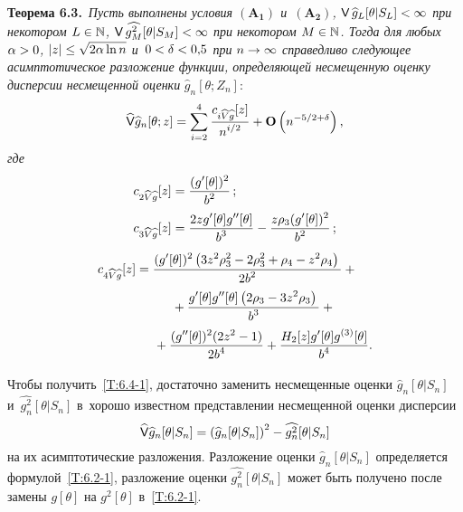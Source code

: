 \begin{multicols}{2}
\noindent
\textbf{Теорема 6.3.}\
\textit{Пусть выполнены условия $\mathbf{(A_1)}$ и~$\mathbf{(A_2)}$,
 ${\sf V}\, \widehat{g}_L[\theta|S_L]\hm<\infty$ при некотором $L\hm\in\mathbb{N}$,
 ${\sf V}\, \widehat{g^2_M}[\theta|S_M]\hm<\infty$ при некотором $M\hm\in\mathbb{N}$.
 Тогда для любых $\alpha\hm>0$, $|z|\hm\le \sqrt{2\alpha\ln n}$ и~$0\hm<\delta\hm<0{,}5$ при $n\hm\to\infty$ справедливо следующее асимптотическое разложение функции,
 определяющей несмещенную оценку дисперсии несмещенной оценки}
 $\widehat{g}_n[\theta;Z_n]$:
 \begin{equation}
 \widehat{{\sf V}} \widehat{g}_n[\theta;z]=
  \sum_{i=2}^4 \displaystyle\frac{\displaystyle c_{i\widehat{V}\widehat{g}}[z]\mathstrut}{\displaystyle n^{i/2}\mathstrut}+
  \mathbf{O}\left( n^{-5/2+\delta}\right),
 \label{T:6.4-1}
 \end{equation}
\textit{где}
 \begin{align*}
  c_{2\widehat{V}\widehat{g}}[z]
&   =\displaystyle\frac{\displaystyle (g'[\theta])^2\mathstrut}{\displaystyle b^2\mathstrut}\,;\\
   c_{3\widehat{V}\widehat{g}}[z]&    =
   \displaystyle\frac{\displaystyle 2z g'[\theta] g''[\theta]\mathstrut}{\displaystyle b^3\mathstrut}-\displaystyle\frac{\displaystyle z \rho_3 (g'[\theta])^2\mathstrut}{\displaystyle b^2\mathstrut}\,;
\end{align*}
 \begin{align*}
  c_{4\widehat{V}\widehat{g}}[z]
   &=\fr{(g'[\theta])^2
   \left(3 z^2 \rho_3^2-2\rho_3^2+\rho_4 -  z^2 \rho_4 \right)}{2 b^2}
  +{}\\
  &\hspace*{10mm}{}+\fr{g'[\theta] g''[\theta]\left(2 \rho_3 -3 z^2 \rho_3
  \right)}{b^3}+{}
\\
& \hspace*{5mm}{} +\fr{(g''[\theta])^2 (2z^2-1)}{2 b^4}
   +\fr{H_2[z] g'[\theta] g^{(3)}[\theta]}{b^4}.
 \end{align*}

  \Do Чтобы получить~\eqref{T:6.4-1}, достаточно
  заменить несмещенные оценки $\widehat{g}_n[\theta|S_n]$ 
  и~$\widehat{g^2_n}[\theta|S_n]$ в~хорошо известном представлении
 несмещенной оценки дисперсии
 \begin{equation*}
 \widehat{{\sf V}} \widehat{g}_n[\theta|S_n]=
 \left(\widehat{g}_n[\theta|S_n]\right)^2-\widehat{g^2_n}[\theta|S_n]
 \end{equation*}
  на их асимптотические разложения.
  Разложение оценки $\widehat{g}_n[\theta|S_n]$ определяется формулой~\eqref{T:6.2-1},
  разложение оценки $\widehat{g^2_n}[\theta|S_n]$ может быть получено
  после замены $g[\theta]$ на $g^2[\theta]$ в~\eqref{T:6.2-1}.

  \smallskip


\end{multicols}
